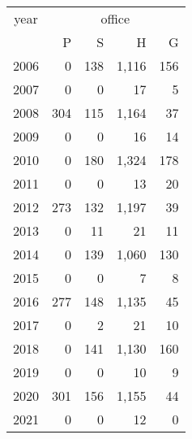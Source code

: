 \footnotesize\begin{tabular}[t]{lrrrr}
\toprule
\multicolumn{1}{c}{year} & \multicolumn{4}{c}{office} \\
\cmidrule(l{3pt}r{3pt}){1-1} \cmidrule(l{3pt}r{3pt}){2-5}
  & P & S & H & G\\
\midrule
2006 & 0 & 138 & 1,116 & 156\\
2007 & 0 & 0 & 17 & 5\\
2008 & 304 & 115 & 1,164 & 37\\
2009 & 0 & 0 & 16 & 14\\
2010 & 0 & 180 & 1,324 & 178\\
2011 & 0 & 0 & 13 & 20\\
2012 & 273 & 132 & 1,197 & 39\\
2013 & 0 & 11 & 21 & 11\\
2014 & 0 & 139 & 1,060 & 130\\
2015 & 0 & 0 & 7 & 8\\
2016 & 277 & 148 & 1,135 & 45\\
2017 & 0 & 2 & 21 & 10\\
2018 & 0 & 141 & 1,130 & 160\\
2019 & 0 & 0 & 10 & 9\\
2020 & 301 & 156 & 1,155 & 44\\
2021 & 0 & 0 & 12 & 0\\
\bottomrule
\end{tabular}
